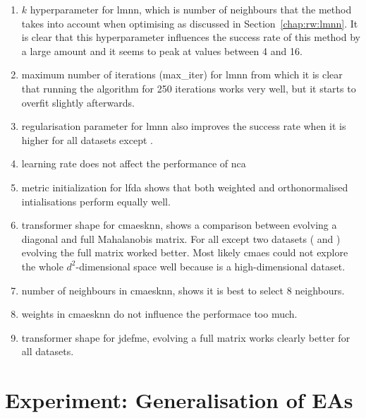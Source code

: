 \begin{enumerate}
\item $k$ hyperparameter for \ac{lmnn}, which is number of neighbours that the method takes into account when optimising as discussed in Section~\ref{chap:rw:lmnn}. It is clear that this hyperparameter influences the success rate of this method by a large amount and it seems to peak at values between 4 and 16.

\item maximum number of iterations (max\_iter) for \ac{lmnn} from which it is clear that running the algorithm for 250 iterations works very well, but it starts to overfit slightly afterwards.

\item regularisation parameter for \ac{lmnn} also improves the success rate when it is higher for all datasets except .

\item learning rate does not affect the performance of \ac{nca}

\item metric initialization for \ac{lfda} shows that both weighted and orthonormalised intialisations perform equally well.

\item transformer shape for \ac{cmaesknn}, shows a comparison between evolving a diagonal and full Mahalanobis matrix. For all except two datasets ( and ) evolving the full matrix worked better. Most likely \ac{cmaes} could not explore the whole $d^2$-dimensional space well because  is a high-dimensional dataset.

\item number of neighbours in \ac{cmaesknn}, shows it is best to select 8 neighbours.

\item weights in \ac{cmaesknn} do not influence the performace too much.

\item transformer shape for \ac{jdefme}, evolving a full matrix works clearly better for all datasets.
\end{enumerate}


\section{Experiment: Generalisation of EAs} \label{chap:exp:fitness}

